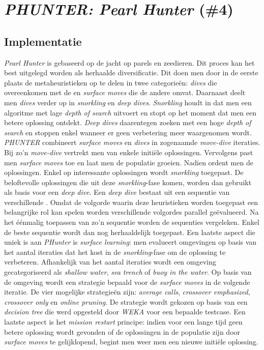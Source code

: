 \section{\emph{PHUNTER: Pearl Hunter} (\#4)}
\label{sss:phunter}
\subsection{Implementatie}
\emph{Pearl Hunter}\cite{chesc-phunter} is gebaseerd op de jacht op parels en zeedieren. Dit proces kan het best uitgelegd worden als herhaalde diversificatie. Dit doen men door in de eerste plaats de metaheuristieken op te delen in twee categorie\"en: \emph{dives} die overeenkomen met de \abls{} \abllhn{} en \emph{surface moves} die de andere \abhn{} omvat. Daarnaast deelt men \emph{dives} verder op in \emph{snorkling} en \emph{deep dives}. \emph{Snorkling} houdt in dat men een \abls{} algoritme met lage \emph{depth of search} uitvoert en stopt op het moment dat men een betere oplossing ontdekt. \emph{Deep dives} daarentegen zoeken met een hoge \emph{depth of search} en stoppen enkel wanneer er geen verbetering meer waargenomen wordt. \emph{PHUNTER} combineert \emph{surface moves} en \emph{dives} in zogenaamde \emph{move-dive} iteraties. Bij zo'n \emph{move-dive} vertrekt men van enkele initi\"ele oplossingen. Vervolgens past men \emph{surface moves} toe en laat men de populatie groeien. Nadien ordent men de oplossingen. Enkel op interessante oplossingen wordt \emph{snorkling} toegepast. De beloftevolle oplossingen die uit deze \emph{snorkling}-fase komen, worden dan gebruikt als basis voor een \emph{deep dive}. Een \emph{deep dive} bestaat uit een sequentie van verschillende \abls{} \abllhn{}. Omdat de volgorde waarin deze heuristieken worden toegepast een belangrijke rol kan spelen worden verschillende volgordes parallel ge\"evalueerd. Na het \'e\'enmalig toepassen van zo'n sequentie worden de sequenties vergeleken. Enkel de beste sequentie wordt dan nog herhaaldelijk toegepast. Een laatste aspect die uniek is aan \emph{PHunter} is \emph{surface learning}: men evalueert omgevingen op basis van het aantal \abls{} iteraties dat het kost in de \emph{snorkling}-fase om de oplossing te verbeteren. Afhankelijk van het aantal iteraties wordt een omgeving gecategoriseerd als \emph{shallow water}, \emph{sea trench} of \emph{buoy in the water}. Op basis van de omgeving wordt een strategie bepaald voor de \emph{surface moves} in de volgende iteratie. De vier mogelijke strategie\"en zijn: \emph{average calls}, \emph{crossover emphasized}, \emph{crossover only} en \emph{online pruning}. De strategie wordt gekozen op basis van een \emph{decision tree} die werd opgesteld door \emph{WEKA} voor een bepaalde testcase. Een laatste aspect is het \emph{mission restart} principe: indien voor een lange tijd geen betere oplossing wordt gevonden of de oplossingen in de populatie zijn door \emph{surface moves} te gelijklopend, begint men weer men een nieuwe initi\"ele oplossing.
